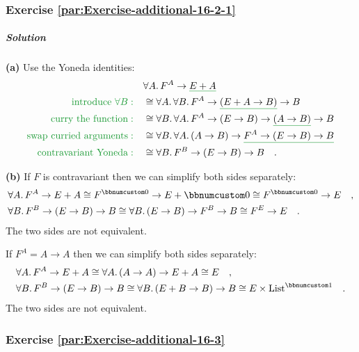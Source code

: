 \subsubsection*{Exercise \ref{par:Exercise-additional-16-2-1}}

\subparagraph{Solution }

\textbf{(a)} Use the Yoneda identities:
\begin{align*}
 & \forall A.\,F^{A}\rightarrow\gunderline{E+A}\\
{\color{greenunder}\text{introduce }\forall B:}\quad & \cong\forall A.\,\forall B.\,F^{A}\rightarrow\gunderline{(E+A\rightarrow B)}\rightarrow B\\
{\color{greenunder}\text{curry the function}:}\quad & \cong\forall B.\,\forall A.\,F^{A}\rightarrow(E\rightarrow B)\rightarrow\gunderline{(A\rightarrow B)}\rightarrow B\\
{\color{greenunder}\text{swap curried arguments}:}\quad & \cong\forall B.\,\forall A.\,(A\rightarrow B)\rightarrow\gunderline{F^{A}\rightarrow(E\rightarrow B)\rightarrow B}\\
{\color{greenunder}\text{contravariant Yoneda}:}\quad & \cong\forall B.\,F^{B}\rightarrow(E\rightarrow B)\rightarrow B\quad.
\end{align*}

\textbf{(b)} If $F$ is contravariant then we can simplify both sides
separately:
\begin{align*}
 & \forall A.\,F^{A}\rightarrow E+A\cong F^{\bbnum 0}\rightarrow E+\bbnum 0\cong F^{\bbnum 0}\rightarrow E\quad,\\
 & \forall B.\,F^{B}\rightarrow(E\rightarrow B)\rightarrow B\cong\forall B.\,(E\rightarrow B)\rightarrow F^{B}\rightarrow B\cong F^{E}\rightarrow E\quad.
\end{align*}
The two sides are not equivalent.

If $F^{A}=A\rightarrow A$ then we can simplify both sides separately:
\begin{align*}
 & \forall A.\,F^{A}\rightarrow E+A\cong\forall A.\,(A\rightarrow A)\rightarrow E+A\cong E\quad,\\
 & \forall B.\,F^{B}\rightarrow(E\rightarrow B)\rightarrow B\cong\forall B.\,(E+B\rightarrow B)\rightarrow B\cong E\times\text{List}^{\bbnum 1}\quad.
\end{align*}
The two sides are not equivalent.

\subsubsection*{Exercise \ref{par:Exercise-additional-16-3}}

